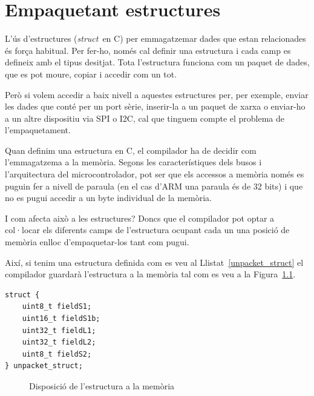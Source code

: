 \chapter{Empaquetant estructures}
\label{ch:estructures}

L'ús d'estructures ({\em struct} en C) per emmagatzemar dades que estan relacionades és força habitual. Per fer-ho, només cal definir una estructura i cada camp es defineix amb el tipus desitjat. Tota l'estructura funciona com un paquet de dades, que es pot moure, copiar i accedir com un tot.

Però si volem accedir a baix nivell a aquestes estructures per, per exemple, enviar les dades que conté per un port sèrie, inserir-la a un paquet de xarxa o enviar-ho a un altre dispositiu via SPI o I2C, cal que tinguem compte el problema de l'empaquetament.

Quan definim una estructura en C, el compilador ha de decidir com l'emmagatzema a la memòria. Segons les característiques dels busos i l'arquitectura del microcontrolador, pot ser que els accessos a memòria només es puguin fer a nivell de paraula (en el cas d'ARM una paraula és de 32 bits) i que no es pugui accedir a un byte individual de la memòria.

I com afecta això a les estructures? Doncs que el compilador pot optar a col·locar els diferents camps de l'estructura ocupant cada un una posició de memòria enlloc d'empaquetar-los tant com pugui.

Així, si tenim una estructura definida com es veu al Llistat~\ref{unpacket_struct} el compilador guardarà l'estructura a la memòria tal com es veu a la Figura~\ref{fig:UnpackedMemoryStructure}. 

\begin{lstlisting}[style=customc,caption={Estructura d'exemple},label=unpacket_struct]
 struct {
	uint8_t fieldS1;
	uint16_t fieldS1b;
	uint32_t fieldL1;
	uint32_t fieldL2;
	uint8_t fieldS2;
} unpacket_struct;
\end{lstlisting}


\begin{figure}
 \centering
 \caption{Disposició de l'estructura a la memòria}
 \label{fig:UnpackedMemoryStructure}
\end{figure}

